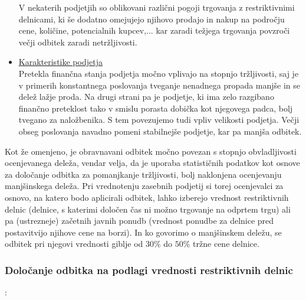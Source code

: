\documentclass[12pt,a4paper]{amsart}
\theoremstyle{definition} %
\theoremstyle{plain} %
\begin{document}
\begin{itemize}
V nekaterih podjetjih so oblikovani različni pogoji trgovanja z restriktivnimi delnicami, ki še dodatno omejujejo njihovo prodajo in nakup na področju cene, količine, potencialnih kupcev,... kar zaradi težjega trgovanja povzroči večji odbitek zaradi netržljivosti.
\item\underline{Karakteristike podjetja}\\
Pretekla finančna stanja podjetja močno vplivajo na stopnjo tržljivosti, saj je v primerih konstantnega poslovanja tveganje nenadnega propada manjše in se delež lažje proda. Na drugi strani pa je podjetje, ki ima zelo razgibano finančno preteklost tako v smislu porasta dobička kot njegovega padca, bolj tvegano za naložbenika. S tem povezujemo tudi vpliv velikosti podjetja. Večji obseg poslovanja navadno pomeni stabilnejše podjetje, kar pa manjša odbitek. 
\end{itemize}
Kot že omenjeno, je obravnavani odbitek močno povezan s stopnjo obvladljivosti ocenjevanega deleža, vendar velja, da je uporaba statističnih podatkov kot osnove za določanje odbitka za pomanjkanje tržljivosti, bolj naklonjena ocenjevanju manjšinskega deleža. Pri vrednotenju zasebnih podjetij si torej ocenjevalci za osnovo, na katero bodo aplicirali odbitek, lahko izberejo vrednost restriktivnih delnic (delnice, s katerimi določen čas ni možno trgovanje na odprtem trgu) ali pa (ustrezneje) začetnih javnih ponudb (vrednost ponudbe za delnice pred postavitvijo njihove cene na borzi). In ko govorimo o manjšinskem deležu, se odbitek pri njegovi vrednosti giblje od $30\%$ do $50\%$ tržne cene delnice.

\subsubsection{Določanje odbitka na podlagi vrednosti restriktivnih delnic}:\\
\end{document}
